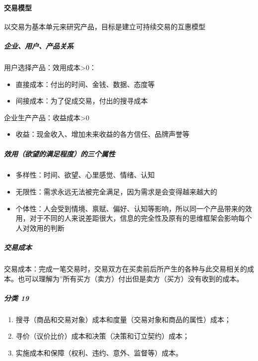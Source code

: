 \documentclass[letterpaper,11pt,english]{sphinxmanual}
\begin{document}
\paragraph{交易模型}
\label{\detokenize{chapter_idea/business:id16}}
以交易为基本单元来研究产品，目标是建立可持续交易的互惠模型


\subparagraph{企业、用户、产品关系}
\label{\detokenize{chapter_idea/business:id17}}
用户选择产品：效用\sphinxhyphen{}成本>0：
\begin{itemize}
\item {} 
直接成本：付出的时间、金钱、数据、态度等

\item {} 
间接成本：为了促成交易，付出的搜寻成本

\end{itemize}

企业生产产品：收益\sphinxhyphen{}成本>0
\begin{itemize}
\item {} 
收益：现金收入、增加未来收益的各方信任、品牌声誉等

\end{itemize}


\subparagraph{效用（欲望的满足程度）的三个属性}
\label{\detokenize{chapter_idea/business:id18}}\begin{itemize}
\item {} 
多样性：时间、欲望、心里感觉、情绪、认知

\item {} 
无限性：需求永远无法被完全满足，因为需求是会变得越来越大的

\item {} 
个体性：人会受到情境、禀赋、偏好、认知等影响，所以同一个产品带来的效用，对于不同的人来说差距很大，信息的完全性及原有的思维框架会影响每个人对效用的判断

\end{itemize}


\subparagraph{交易成本}
\label{\detokenize{chapter_idea/business:id19}}
交易成本：完成一笔交易时，交易双方在买卖前后所产生的各种与此交易相关的成本。也可以理解为”所有买方（卖方）付出但是卖方（买方）没有收到的成本。


\subparagraph{分类 19\sphinxfootnotemark[345]}
\label{\detokenize{chapter_idea/business:id20}}%
\begin{footnotetext}[345]\sphinxAtStartFootnote
{}
%
\end{footnotetext}\ignorespaces \begin{enumerate}
%
\item {} 
搜寻（商品和交易对象）成本和度量（交易对象和商品的属性）成本；

\item {} 
寻价（议价比价）成本和决策（决策和订立契约）成本；

\item {} 
实施成本和保障（权利、违约、意外、监督等）成本。

\end{enumerate}
\end{document}
